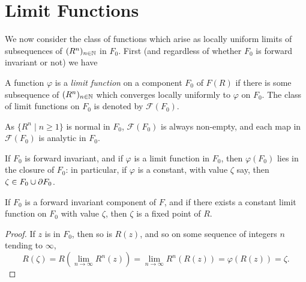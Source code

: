 \section{Limit Functions}
\label{sec:limit_functions}

We now consider the class of functions which arise as locally uniform limits of
subsequences of $(R^n)_{n \in \mathbb{N}}$ in $F_0$. First (and regardless of whether
$F_0$ is forward invariant or not) we have

\begin{definition}
    A function $\varphi$ is a \emph{limit function} on a component $F_0$ of
    $F(R)$ if there is some subsequence of $(R^n)_{n \in \mathbb{N}}$ which converges
    locally uniformly to $\varphi$ on $F_0$. The class of limit functions on
    $F_0$ is denoted by $\mathcal{F}(F_0)$.
\end{definition}

\begin{remark}
    As $\{R^n \mid n \geq 1\}$ is normal in $F_0$, $\mathcal{F}(F_0)$ is always
    non-empty, and each map in $\mathcal{F}(F_0)$ is analytic in $F_0$.
\end{remark}

\begin{remark}
    If $F_0$ is forward invariant, and if $\varphi$ is a limit function in
    $F_0$, then $\varphi(F_0)$ lies in the closure of $F_0$: in particular, if
    $\varphi$ is a constant, with value $\zeta$ say, then $\zeta \in F_0 \cup
    \partial {F_0}$.
\end{remark}

\begin{lemma}
    If $F_0$ is a forward invariant component of $F$, and if there exists a
    constant limit function on $F_0$ with value $\zeta$, then $\zeta$ is a fixed
    point of $R$.
\end{lemma}
\begin{proof}
    If $z$ is in $F_0$, then so is $R(z)$, and so on some sequence of integers
    $n$ tending to $\infty$,
    \begin{equation*}
        R(\zeta) = R\left(\lim_{n \to \infty} R^n(z) \right) = \lim_{n \to \infty} R^n(R(z)) = \varphi(R(z)) = \zeta.
    \end{equation*}
\end{proof}

